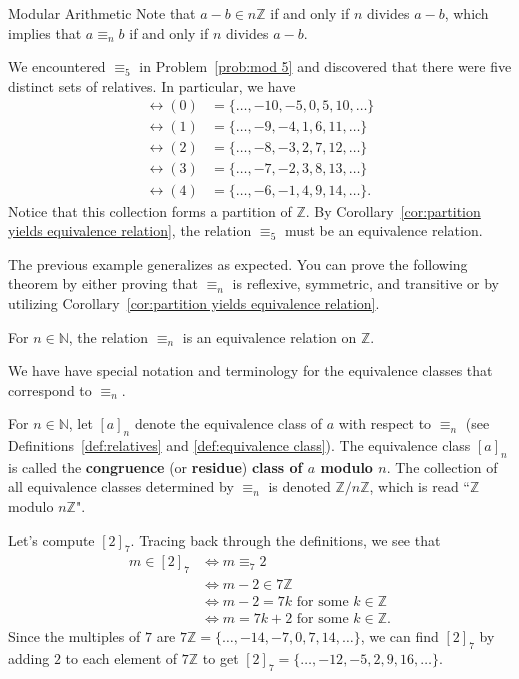 \begin{section}{Modular Arithmetic}
Note that $a-b \in n\mathbb{Z}$ if and only if $n$ divides $a-b$, which implies that $a\equiv_n b$ if and only if $n$ divides $a-b$.

\begin{example}
We encountered $\equiv_5$ in Problem~\ref{prob:mod 5} and discovered that there were five distinct sets of relatives.  In particular, we have
\begin{align*}
\rel(0) & = \{\ldots, -10, -5, 0, 5, 10,\ldots\}\\
\rel(1) & = \{\ldots, -9, -4, 1, 6, 11,\ldots\}\\
\rel(2) & = \{\ldots, -8, -3, 2, 7, 12,\ldots\}\\
\rel(3) & = \{\ldots, -7, -2, 3, 8, 13,\ldots\}\\
\rel(4) & = \{\ldots, -6, -1, 4, 9, 14,\ldots\}.
\end{align*}
Notice that this collection forms a partition of $\mathbb{Z}$.  By Corollary~\ref{cor:partition yields equivalence relation}, the relation $\equiv_5$ must be an equivalence relation.
\end{example}

The previous example generalizes as expected. You can prove the following theorem by either proving that $\equiv_n$ is reflexive, symmetric, and transitive or by utilizing Corollary~\ref{cor:partition yields equivalence relation}.

\begin{theorem}
For $n\in \mathbb{N}$, the relation $\equiv_n$ is an equivalence relation on $\mathbb{Z}$.
\end{theorem}

We have have special notation and terminology for the equivalence classes that correspond to $\equiv_n$.

\begin{definition}\label{def:modulo}
For $n\in \mathbb{N}$, let $[a]_n$ denote the equivalence class of $a$ with respect to $\equiv_n$ (see Definitions~\ref{def:relatives} and \ref{def:equivalence class}). The equivalence class $[a]_n$ is called the \textbf{congruence} (or \textbf{residue}) \textbf{class of $a$ modulo $n$}. The collection of all equivalence classes determined by $\equiv_n$ is denoted $\mathbb{Z}/n\mathbb{Z}$, which is read ``$\mathbb{Z}$ modulo $n\mathbb{Z}$".
\end{definition}

\begin{example}\label{exam:twomodseven}
Let's compute $[2]_7$.  Tracing back through the definitions, we see that
\begin{align*}
m \in [2]_7 & \iff m \equiv_7 2\\
& \iff m-2\in 7\mathbb{Z}\\
& \iff m-2 = 7k \text{ for some $k\in \mathbb{Z}$}\\
& \iff m = 7k+2 \text{ for some $k\in \mathbb{Z}$}.
\end{align*}
Since the multiples of $7$ are $7\mathbb{Z} = \{\ldots,-14,-7,0,7,14,\ldots\}$, we can find $[2]_7$ by adding $2$ to each element of $7\mathbb{Z}$ to get $[2]_7 = \{\ldots,-12,-5,2,9,16,\ldots\}$.
\end{example}


\end{section}
